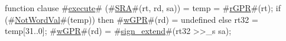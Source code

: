 function clause #\hyperref[zexecute]{execute}# (#\hyperref[zSRA]{SRA}#(rt, rd, sa)) =
  {
    temp = #\hyperref[zrGPR]{rGPR}#(rt);
    if (#\hyperref[zNotWordVal]{NotWordVal}#(temp)) then
      #\hyperref[zwGPR]{wGPR}#(rd) = undefined
    else {
      rt32 = temp[31..0];
      #\hyperref[zwGPR]{wGPR}#(rd) = #\hyperref[zsignzyextend]{sign\_extend}#(rt32 >>_s sa);
    }
  }
